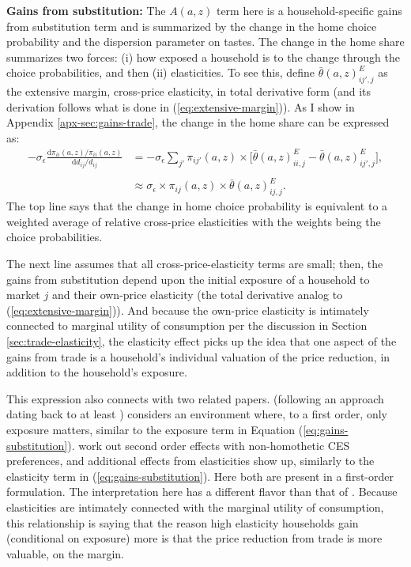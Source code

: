 \documentclass[12pt,pdftex]{article}
\begin{document}
\begin{onehalfspacing}
\textbf{Gains from substitution:} The $A(a,z)$ term here is a household-specific gains from substitution term and is summarized by the change in the home choice probability and the dispersion parameter on tastes. The change in the home share summarizes two forces: (i) how exposed a household is to the change through the choice probabilities, and then (ii) elasticities. To see this, define $\bar{\theta}(a,z) ^E_{ij',j}$ as the extensive margin, cross-price elasticity, in total derivative form (and its derivation follows what is done in (\ref{eq:extensive-margin})). As I show in Appendix \ref{apx-sec:gains-trade}, the change in the home share can be expressed as:
\begin{align}
-\sigma_{\epsilon} \frac{\mathrm{d} \pi_{ii}(a,z) / \pi_{ii}(a,z) }{\mathrm{d} d_{ij} / d_{ij}} &= -\sigma_{\epsilon} \sum_{j'} \pi_{ij'}(a,z) \times \bigg[ \bar{\theta}(a,z) ^E_{ii,j} - \bar{\theta}(a,z) ^E_{ij',j}\bigg], \\
\nonumber \\
&\approx
\sigma_{\epsilon} \times \pi_{ij}(a,z) \times \bar{\theta}(a,z) ^E_{ij,j}.
\label{eq:gains-substitution}
\end{align}
The top line says that the change in home choice probability is equivalent to a weighted average of relative cross-price elasticities with the weights being the choice probabilities.

The next line assumes that all cross-price-elasticity terms are small; then, the gains from substitution depend upon the initial exposure of a household to market $j$ and their own-price elasticity (the total derivative analog to (\ref{eq:extensive-margin})). And because the own-price elasticity is intimately connected to marginal utility of consumption per the discussion in Section \ref{sec:trade-elasticity}, the elasticity effect picks up the idea that one aspect of the gains from trade is a household's individual valuation of the price reduction, in addition to the household's exposure.

This expression also connects with two related papers. \citet{borusyak2021distributional} (following an approach dating back to at least \citet{deaton1989rice}) considers an environment where, to a first order, only exposure matters, similar to the exposure term in Equation (\ref{eq:gains-substitution}). \citet{auer2022unequal} work out second order effects with non-homothetic CES preferences, and additional effects from elasticities show up, similarly to the elasticity term in (\ref{eq:gains-substitution}). Here both are present in a first-order formulation. The interpretation here has a different flavor than that of \citet{auer2022unequal}. Because elasticities are intimately connected with the marginal utility of consumption, this relationship is saying that the reason high elasticity households gain (conditional on exposure) more is that the price reduction from trade is more valuable, on the margin.


\end{onehalfspacing}
\end{document}
